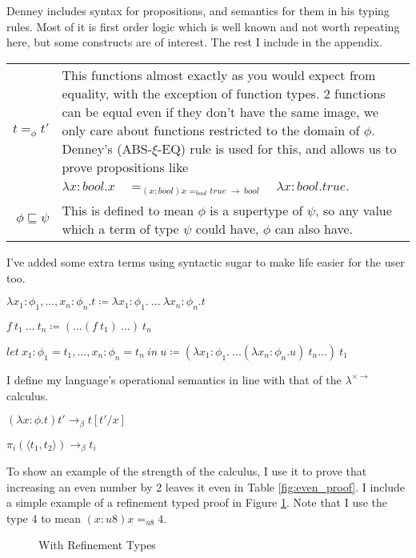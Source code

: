 Denney includes syntax for propositions, and semantics for them in his typing rules.
Most of it is first order logic which is well known and not worth repeating here, but some constructs
are of interest.
The rest I include in the appendix.

\begin{tabular}{r|p{}}
    $t =_\phi t'$ &
    This functions almost exactly as you would expect from equality, with the exception of function types.
    2 functions can be equal even if they don't have the same image, we only care about functions
    restricted to the domain of $\phi$.
    Denney's (ABS-$\xi$-EQ) rule is used for this, and allows us to prove propositions like\newline
    $\lambda x: bool . x \quad =_{(x:bool) x =_{bool} true\ \rightarrow\ bool} \quad \lambda x: bool . true$.
    \\\cline{1-2}
    $\phi \sqsubseteq \psi$ &
    This is defined to mean $\phi$ is a supertype of $\psi$,
    so any value which a term of type $\psi$ could have, $\phi$ can also have.
\end{tabular}

I've added some extra terms using syntactic sugar to make life easier for the user too.

\begin{center}
    $\lambda x_1: \phi_1, ..., x_n: \phi_n . t \coloneqq \lambda x_1: \phi_1 .\ ...\ \lambda x_n: \phi_n . t$

    $f\ t_1\ ...\ t_n \coloneqq (...(f\ t_1)\ ...)\ t_n$

    $let\ x_1: \phi_1 = t_1, ..., x_n: \phi_n = t_n\ in\ u \coloneqq (\lambda x_1: \phi_1 .\ ...(\lambda x_n: \phi_n . u)\ t_n...)\ t_1$
\end{center}

I define my language's operational semantics in line with that of the $\lambda^{\times \rightarrow}$ calculus.

\begin{center}
    $(\lambda x: \phi . t) t' \rightarrow_\beta t[t'/x]$

    $\pi_i(\langle t_1, t_2 \rangle) \rightarrow_\beta t_i$
\end{center}

To show an example of the strength of the calculus, I use it to prove that increasing an even number by
2 leaves it even in Table \ref{fig:even_proof}.
I include a simple example of a refinement typed proof in Figure \ref{fig:refinement_proof_example}.
Note that I use the type $4$ to mean $(x:u8) x =_{u8} 4$.
\begin{figure}
    \centering
    \begin{prooftree}
    \end{prooftree}
    \caption{With Refinement Types}
    \label{fig:refinement_proof_example}
\end{figure}

